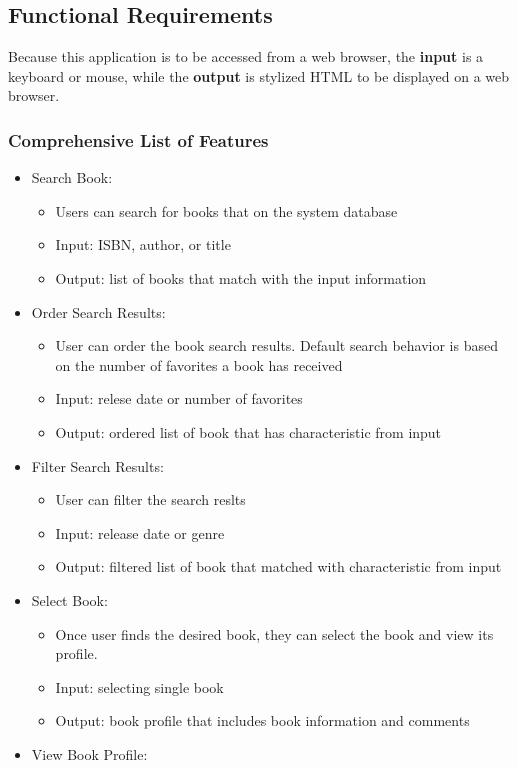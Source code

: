 \documentclass[letter, 12pt, titlepage]{article}
\begin{document}
\subsection{Functional Requirements}
Because this application is to be accessed from a web browser, the \textbf{input} is a keyboard or mouse, while the \textbf{output} is stylized HTML to be displayed on a web browser.

\subsubsection{Comprehensive List of Features}
\begin{itemize}

	\item	Search Book:
	      \begin{itemize}
		      \item  Users can search for books that on the system database
		      \item  Input: ISBN, author, or title
		      \item  Output: list of books that match with the input information
	      \end{itemize}
	\item	Order Search Results:
	      \begin{itemize}
		      \item  User can order the book search results. Default search behavior is based on the number of favorites a book has received
		      \item  Input: relese date or number of favorites
		      \item  Output: ordered list of book that has characteristic from input
	      \end{itemize}
	\item	Filter Search Results:
	      \begin{itemize}
		      \item  User can filter the search reslts
		      \item  Input: release date or genre
		      \item  Output: filtered list of book that matched with characteristic from input
	      \end{itemize}
	\item	Select Book:
	      \begin{itemize}
		      \item  Once user finds the desired book, they can select the book and view its profile.
		      \item  Input: selecting single book
		      \item  Output: book profile that includes book information and comments
	      \end{itemize}
	\item	View Book Profile:


\end{itemize}
\end{document}
